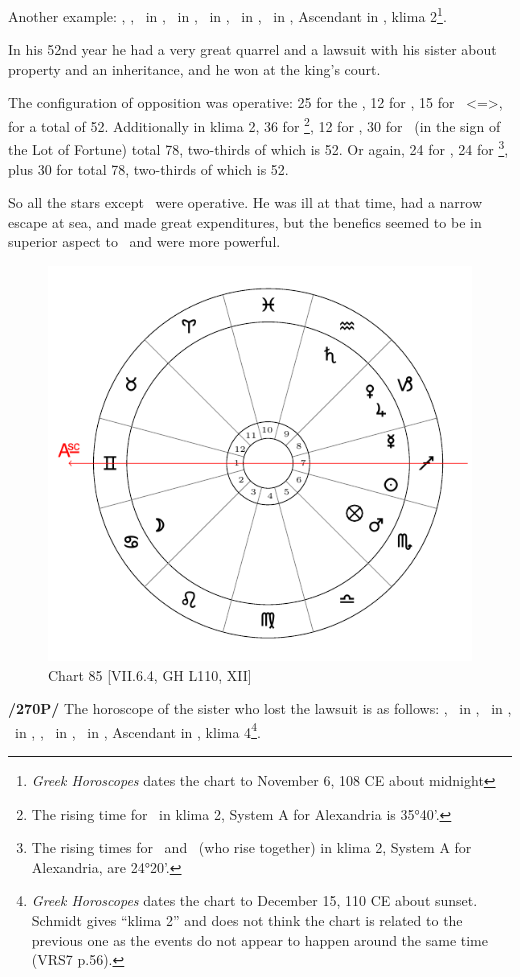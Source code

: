 Another example: \Sun, \Mercury, \Jupiter\, in \Scorpio, \Moon\, in \Taurus, \Saturn\, in \Aquarius, \Mars\, in \Virgo, \Venus\, in \Libra, Ascendant in \Leo, klima 2\footnote{\textit{Greek Horoscopes} dates the chart to November 6, 108 CE about midnight}.

In his 52nd year he had a very great quarrel and a lawsuit with his sister about property and an inheritance, and he won at the king’s court. 

The configuration of opposition was operative: 25 for the \Moon, 12 for \Jupiter, 15 for \Scorpio\, <=\Mars>, for a
total of 52. Additionally in klima 2, 36 for \Scorpio\footnote{The rising time for \Scorpio\, in klima 2, System A for Alexandria is 35°40'.}, 12 for \Jupiter, 30 for \Saturn\, (in the sign of the Lot of Fortune) total 78, two-thirds of which is 52. Or again, 24 for \Taurus, 24 for \Aquarius\footnote{The rising times for \Taurus\, and \Aquarius\, (who rise together) in klima 2, System A for Alexandria, are 24°20'.}, plus 30 for \Saturn total 78, two-thirds of which is 52. 

So all the stars except \Mars\, were operative. He was ill at that time, had a narrow escape at sea, and made great expenditures, but the benefics seemed to be in superior aspect to \Saturn\, and were more powerful.

\newpage 
\begin{figure}
\centering
\vspace{0pt}
\includegraphics[width=.68\textwidth]{charts/7_6_04}
\caption{Chart 85 [VII.6.4, GH L110, XII]}
\label{fig:chart85}
\end{figure} 

\noindent\textbf{/270P/} The horoscope of the sister who lost the lawsuit is as follows: \Sun, \Mercury\, in \Sagittarius, \Moon\, in \Cancer, \Saturn\, in \Aquarius, \Jupiter, \Venus\, in \Capricorn, \Mars\, in \Scorpio, Ascendant in \Gemini, klima 4\footnote{\textit{Greek Horoscopes} dates the chart to December 15, 110 CE about sunset. Schmidt gives ``klima 2'' and does not think the chart is related to the previous one as the events do not appear to happen around the same time (VRS7 p.56).}.

